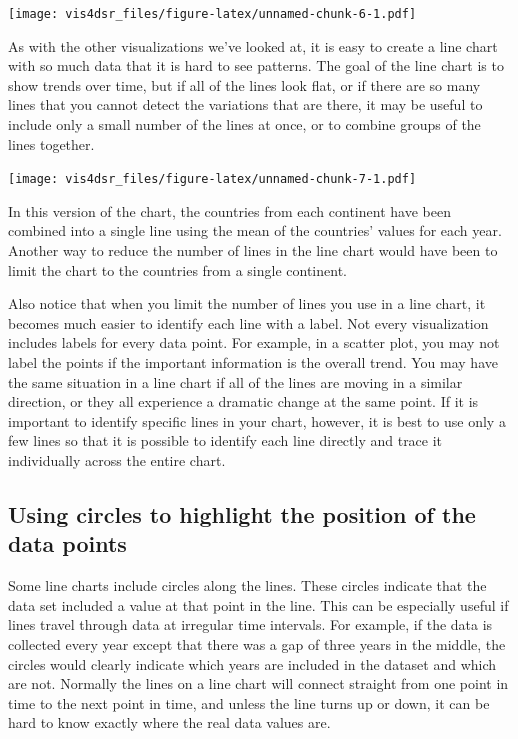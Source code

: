 \documentclass[
]{krantz}
\begin{document}
\texttt{[image: vis4dsr\_files/figure-latex/unnamed-chunk-6-1.pdf]}

As with the other visualizations we've looked at, it is easy to create a line chart
with so much data that it is hard to see patterns. The goal of the line chart is to
show trends over time, but if all of the lines look flat, or if there are so many
lines that you cannot detect the variations that are there, it may be useful to include
only a small number of the lines at once, or to combine groups of the lines together.

\texttt{[image: vis4dsr\_files/figure-latex/unnamed-chunk-7-1.pdf]}

In this version of the chart, the countries from each continent have been combined
into a single line using the mean of the countries' values for each year. Another way to
reduce the number of lines in the line chart would have been to limit the chart to
the countries from a single continent.

Also notice that when you limit the number of lines you use in a line chart, it
becomes much easier to identify each line with a label. Not every visualization
includes labels for every data point. For example, in a scatter plot, you may not
label the points if the important information is the overall trend. You may have
the same situation in a line chart if all of the lines are moving in a similar
direction, or they all experience a dramatic change at the same point. If it is
important to identify specific lines in your chart, however, it is best to use only
a few lines so that it is possible to identify each line directly and trace it
individually across the entire chart.

\hypertarget{using-circles-to-highlight-the-position-of-the-data-points}{%
\subsection{Using circles to highlight the position of the data points}\label{using-circles-to-highlight-the-position-of-the-data-points}}

Some line charts include circles along the lines. These circles indicate that the
data set included a value at that point in the line. This can be especially useful
if lines travel through data at irregular time intervals. For example, if the data
is collected every year except that there was a gap of three years in the middle,
the circles would clearly indicate which years are included in the dataset and which
are not. Normally the lines on a line chart will connect straight from one point in
time to the next point in time, and unless the line turns up or down, it can be
hard to know exactly where the real data values are.
\end{document}
